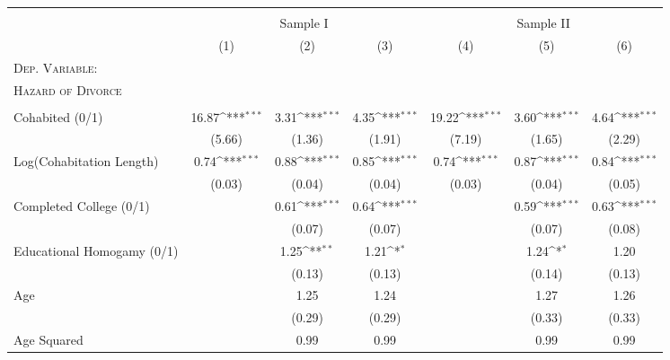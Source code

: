 {\def\sym#1{\ifmmode^{#1}\else\(^{#1}\)\fi}               \begin{tabular}{l*{6}{c}}                           \toprule   
		\\[-1.8ex] & \multicolumn{3}{c}{Sample I} & \multicolumn{3}{c}{Sample II} \\ 
		\cmidrule(lr){2-4} \cmidrule(lr){5-7} 	
		           &\multicolumn{1}{c}{(1)}  &\multicolumn{1}{c}{(2)}  &\multicolumn{1}{c}{(3)}         &\multicolumn{1}{c}{(4)} &\multicolumn{1}{c}{(5)}  &\multicolumn{1}{c}{(6)}        \\              \midrule              \textsc{Dep. Variable:} & & & & & & \\ \textsc{Hazard of Divorce} & & & & & & \\ & & & & & & \\
Cohabited (0/1) &    16.87\sym{***}&     3.31\sym{***}&     4.35\sym{***}&    19.22\sym{***}&     3.60\sym{***}&     4.64\sym{***}\\
                &   (5.66)         &   (1.36)         &   (1.91)         &   (7.19)         &   (1.65)         &   (2.29)         \\
Log(Cohabitation Length)&     0.74\sym{***}&     0.88\sym{***}&     0.85\sym{***}&     0.74\sym{***}&     0.87\sym{***}&     0.84\sym{***}\\
                &   (0.03)         &   (0.04)         &   (0.04)         &   (0.03)         &   (0.04)         &   (0.05)         \\
Completed College (0/1)&                  &     0.61\sym{***}&     0.64\sym{***}&                  &     0.59\sym{***}&     0.63\sym{***}\\
                &                  &   (0.07)         &   (0.07)         &                  &   (0.07)         &   (0.08)         \\
Educational Homogamy (0/1)&                  &     1.25\sym{**} &     1.21\sym{*}  &                  &     1.24\sym{*}  &     1.20         \\
                &                  &   (0.13)         &   (0.13)         &                  &   (0.14)         &   (0.13)         \\
Age             &                  &     1.25         &     1.24         &                  &     1.27         &     1.26         \\
                &                  &   (0.29)         &   (0.29)         &                  &   (0.33)         &   (0.33)         \\
Age Squared     &                  &     0.99         &     0.99         &                  &     0.99         &     0.99         \\

\end{tabular}}
